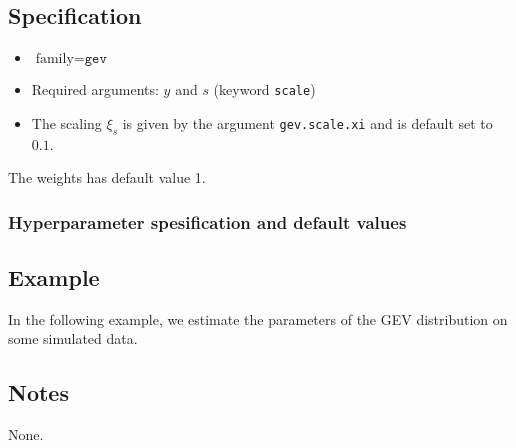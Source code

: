 \documentclass[a4paper,11pt]{article}
\begin{document}
\subsection*{Specification}

\begin{itemize}
\item $\text{family}=\texttt{gev}$
\item Required arguments: $y$ and $s$ (keyword \texttt{scale})
\item The scaling $\xi_{s}$ is given by the argument
    \texttt{gev.scale.xi} and is default set to $0.1$.
\end{itemize}
The weights has default value 1.

\subsubsection*{Hyperparameter spesification and default values}


\subsection*{Example}

In the following example, we estimate the parameters of the GEV
distribution on some simulated data.


\subsection*{Notes}

None.
\end{document}
